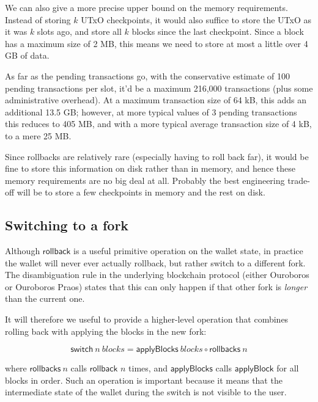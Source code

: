 \documentclass{article}
\theoremstyle{definition}{
  \newtheorem{lemma}{Lemma}[section] %
  \newtheorem{definition}[lemma]{Definition}
}
\theoremstyle{theorem}{
  \newtheorem{invariant}[lemma]{Invariant}
  \newtheorem{proofobligation}[lemma]{Proof Obligation}
}
\numberwithin{equation}{lemma}
\begin{document}
We can also give a more precise upper bound on the memory requirements. Instead
of storing $k$ UTxO checkpoints, it would also suffice to store the UTxO as it
was $k$ slots ago, and store all $k$ blocks since the last checkpoint. Since a
block has a maximum size of 2 MB, this means we need to store at most a little
over 4 GB of data.

As far as the pending transactions go, with the conservative estimate of 100
pending transactions per slot, it'd be a maximum 216,000 transactions (plus some
administrative overhead). At a maximum transaction size of 64 kB, this adds an
additional 13.5 GB; however, at more typical values of 3 pending transactions
this reduces to 405 MB, and with a more typical average transaction size of 4
kB, to a mere 25 MB.

Since rollbacks are relatively rare (especially having to roll back far), it
would be fine to store this information on disk rather than in memory, and hence
these memory requirements are no big deal at all. Probably the best engineering
trade-off will be to store a few checkpoints in memory and the rest on disk.


\subsection{Switching to a fork}

Although $\mathsf{rollback}$ is a useful primitive operation on the wallet
state, in practice the wallet will never ever actually rollback, but rather
switch to a different fork. The disambiguation rule in the underlying blockchain
protocol (either Ouroboros or Ouroboros Praos) states that this can only happen
if that other fork is \emph{longer} than the current one.

It will therefore we useful to provide a higher-level operation that combines
rolling back with applying the blocks in the new fork:

\begin{equation}
\mathsf{switch} ~ n ~ \mathit{blocks} = \mathsf{applyBlocks} ~ \mathit{blocks} \circ \mathsf{rollbacks} ~ n
\end{equation}

where $\mathsf{rollbacks} ~ n$ calls $\mathsf{rollback}$ $n$ times, and
$\mathsf{applyBlocks}$ calls $\mathsf{applyBlock}$ for all blocks in order.
Such an operation is important because it means that the intermediate state
of the wallet during the switch is not visible to the user.
\end{document}
